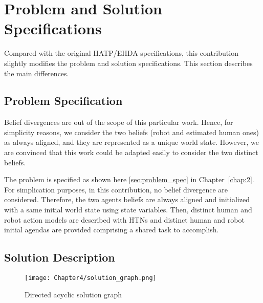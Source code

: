 
\section{Problem and Solution Specifications}

Compared with the original HATP/EHDA specifications, this contribution slightly modifies the problem and solution specifications. This section describes the main differences.

    \subsection*{Problem Specification}

Belief divergences are out of the scope of this particular work. Hence, for simplicity reasons, we consider the two beliefs (robot and estimated human ones) as always aligned, and they are represented as a unique world state. However, we are convinced that this work could be adapted easily to consider the two distinct beliefs.

The problem is specified as shown here \ref{sec:problem_spec} in Chapter~\ref{chap:2}. For simplication purposes, in this contribution, no belief divergence are considered. Therefore, the two agents beliefs are always aligned and initialized with a same initial world state using state variables. Then, distinct human and robot action models are described with HTNs and distinct human and robot initial agendas are provided comprising a shared task to accomplish. 

\subsection*{Solution Description}

\begin{figure}[h]
    \centering
    \texttt{[image: Chapter4/solution\_graph.png]}
    \caption{Directed acyclic solution graph}
    \label{fig:solution_graph}
\end{figure}

